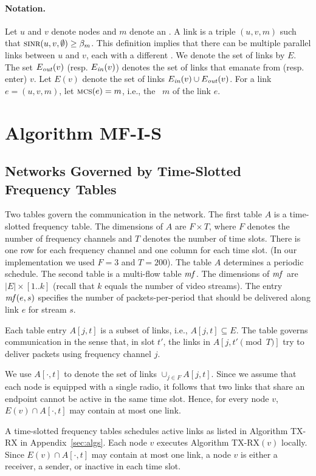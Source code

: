 \documentclass[12pt]{article}
\newenvironment{proof sketch}[1]{\noindent {\emph{Proof sketch of #1:}}}{\hfill \qed}
\newcommand{\SINR}{\text{\sc{sinr}}}
\newcommand{\mf}{\text{\emph{mf}}}
\newcommand{\MCS}{\text{\sc{mcs}}}
\newcommand{\Ein}{E_{\text{\emph{in}}}}
\newcommand{\Eout}{E_{\text{\emph{out}}}}
\newcommand{\algA}{\textsc{MF-I-S}}
\begin{document}
\paragraph{Notation.}
Let $u$ and $v$ denote nodes and $m$ denote an \MCS.  A link is a
triple $(u,v,m)$ such that $\SINR(u,v,\emptyset)\geq \beta_m$.  This
definition implies that there can be multiple parallel links between
$u$ and $v$, each with a different \MCS.
%
We denote the set of links by $E$. The set $\Eout(v)$ (resp.
$\Ein(v)$) denotes the set of links that emanate from (resp. enter)
$v$. Let $E(v)$ denote the set of links $\Ein(v)\cup \Eout(v)$.
%
For a link $e=(u,v,m)$, let $\MCS(e)=m$, i.e., the \MCS\ $m$ of the link $e$.



\section{Algorithm \algA}\label{sec:outline}
\subsection{Networks Governed by Time-Slotted Frequency Tables}\label{sec:govern}
Two tables govern the communication in the network.  The first table
$A$ is a time-slotted frequency table. The dimensions of $A$ are
$F\times T$, where $F$ denotes the number of frequency channels and
$T$ denotes the number of time slots.  There is one row for each
frequency channel and one column for each time slot. (In our
implementation we used $F=3$ and $T=200$).  The table $A$ determines a
periodic schedule.  The second table is a multi-flow table $\mf$. The
dimensions of $\mf$ are $|E|\times [1..k]$ (recall that $k$ equals the
number of video streams).  The entry $\mf(e,s)$ specifies the number
of packets-per-period that should be delivered along link $e$ for
stream $s$.

Each table entry $A[j,t]$ is a subset of links,
i.e., $A[j,t]\subseteq E$.  The table governs communication in the
sense that, in slot $t'$, the links in $A[j,t' \pmod T]$ try to deliver packets
using frequency channel $j$.

We use $A[\cdot,t]$ to denote the set of links $\cup_{j\in F}
A[j,t]$.  Since we assume that each node is equipped with a single
radio, it follows that two links that share an endpoint cannot be
active in the same time slot.  Hence, for every node $v$, $E(v) \cap
A[\cdot ,t]$ may contain at most one link.

A time-slotted frequency tables schedules active links as listed in
Algorithm TX-RX in Appendix~\ref{sec:algs}.  Each node $v$
executes Algorithm TX-RX$(v)$ locally.  Since $E(v) \cap A[\cdot ,t]$
may contain at most one link, a node $v$ is either a receiver, a
sender, or inactive in each time slot.
\end{document}
